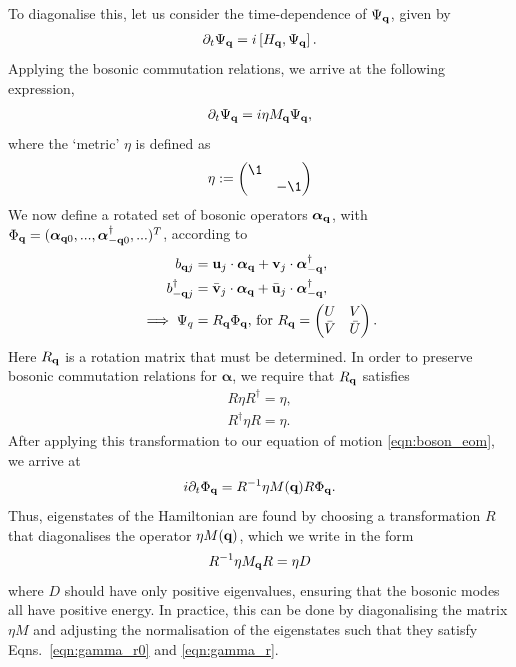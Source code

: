 To diagonalise this, let us consider the time-dependence of $\Psi_{\textbf q}$, given by
\begin{align} 
    \partial_t \Psi_{\textbf q} = i\left [ H_{\textbf q}, \Psi_{\textbf q}\right ].
\end{align}
Applying the bosonic commutation relations, we arrive at the following expression,
\begin{align}\label{eqn:boson_eom}
    \partial_t \Psi_{\textbf q} = i 
    \eta M_{\textbf q}
    \Psi_{\textbf q},
\end{align}
where the `metric' $\eta$ is defined as
\begin{align}
    \eta := 
    \begin{pmatrix}
        \1 & \\
        & -\1
    \end{pmatrix}
\end{align}
We now define a rotated set of bosonic operators $\bm \alpha_{\textbf q}$, with $\Phi_{\textbf q} = (\bm \alpha_{\textbf q 0},...,\bm \alpha^\dag_{-\textbf q 0},...  )^T$, according to
\begin{align} \label{eqn:uv_define}
    b_{\textbf qj} & = 
    \textbf u_j \cdot  \bm \alpha_{\textbf q} +
    \textbf v_j \cdot \bm \alpha^\dag_{-\textbf q},  \\
     b_{-\textbf q j}^\dag & = 
    \bar {\textbf v}_j \cdot \bm \alpha_{\textbf q}  +
    \bar {\textbf u}_j \cdot \bm \alpha^\dag_{-\textbf q}, \\
    \implies      
    \Psi_q
    & = R_{\textbf q} \Phi_{\textbf q} \textup{, for } R_{\textbf q} = \begin{pmatrix}
        U & V\\
         \bar {V} &\bar {U}
    \end{pmatrix}.
\end{align}
Here $R_{\textbf q}$ is a rotation matrix that must be determined. In order to preserve bosonic commutation relations for $\bm \alpha$, we require that $R_{\textbf q}$ satisfies
\begin{align}
    R\eta R^\dag\label{eqn:gamma_r0}
    = \eta, \\
    R^\dag \eta R\label{eqn:gamma_r}
    = \eta.
\end{align}
After applying this transformation to our equation of motion \ref{eqn:boson_eom}, we arrive at
\begin{align}
    i\partial_t \Phi_{\textbf q} = 
    R ^{-1}
    \eta M(\textbf q)
    R
    \Phi_{\textbf q}.
\end{align}
Thus, eigenstates of the Hamiltonian are found by choosing a transformation $R$ that diagonalises the operator $\eta M(\textbf q)$, which we write in the form
\begin{align}
    R^{-1} \eta M_{\textbf q} R = \eta D
\end{align}
where $D$ should have only positive eigenvalues, ensuring that the bosonic modes all have positive energy. In practice, this can be done by diagonalising the matrix $\eta M$ and adjusting the normalisation of the eigenstates such that they satisfy Eqns.~\ref{eqn:gamma_r0} and \ref{eqn:gamma_r}.


